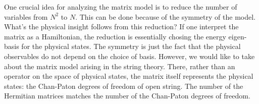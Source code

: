 
One crucial idea for analyzing the matrix model is to reduce the number of variables from $N^2$ to $N$.
This can be done because of the symmetry of the model.
What's the physical insight follows from this reduction?
If one interpret the matrix as a Hamiltonian, the reduction is essentially chosing the energy eigen-basis for the physical states.
The symmetry is just the fact that the physical observables do not depend on the choice of basis.
However, we would like to take about the matrix model arising in the string theory.
There, rather than an operator on the space of physical states,
the matrix itself represents the physical states: the Chan-Paton degrees of freedom of open string.
The number of the Hermitian matrices matches the number of the Chan-Paton degrees of freedom.
